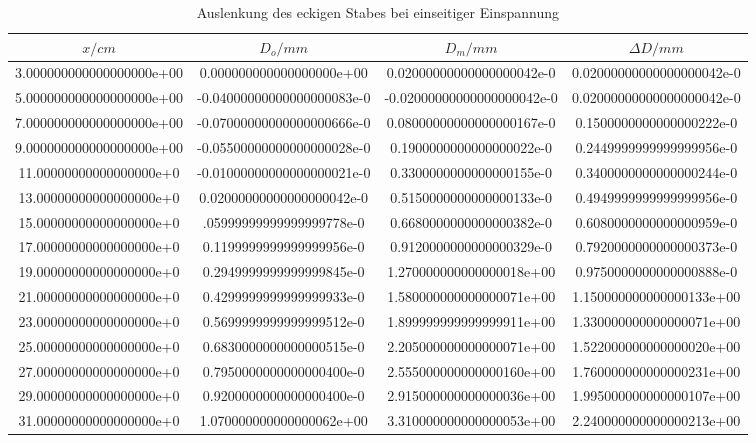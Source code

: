 \begin{table}
  \centering
  \caption{Auslenkung des eckigen Stabes bei einseitiger Einspannung}
  \label{tab:einseitig-q}
  \begin{tabular}{S S S S}
    \toprule
    {$x/cm$} & {$D_o/mm$} & {$D_m /mm$} & {$\Delta D /mm$}\\
    \midrule
    3.000000000000000000e+00 & 0.000000000000000000e+00 & 0.02000000000000000042e-0 & 0.02000000000000000042e-0\\
    5.000000000000000000e+00 & -0.04000000000000000083e-0 & -0.02000000000000000042e-0 & 0.02000000000000000042e-0\\
    7.000000000000000000e+00 & -0.07000000000000000666e-0 & 0.08000000000000000167e-0 & 0.1500000000000000222e-0\\
    9.000000000000000000e+00 & -0.05500000000000000028e-0 & 0.1900000000000000022e-0 & 0.2449999999999999956e-0\\
    11.00000000000000000e+0 & -0.01000000000000000021e-0 & 0.3300000000000000155e-0 & 0.3400000000000000244e-0\\
    13.00000000000000000e+0 & 0.02000000000000000042e-0 & 0.5150000000000000133e-0 & 0.4949999999999999956e-0\\
    15.00000000000000000e+0 & .05999999999999999778e-0 & 0.6680000000000000382e-0 & 0.6080000000000000959e-0\\
    17.00000000000000000e+0 & 0.1199999999999999956e-0 & 0.9120000000000000329e-0 & 0.7920000000000000373e-0\\
    19.00000000000000000e+0 & 0.2949999999999999845e-0 & 1.270000000000000018e+00 & 0.9750000000000000888e-0\\
    21.00000000000000000e+0 & 0.4299999999999999933e-0 & 1.580000000000000071e+00 & 1.150000000000000133e+00\\
    23.00000000000000000e+0 & 0.5699999999999999512e-0 & 1.899999999999999911e+00 & 1.330000000000000071e+00\\
    25.00000000000000000e+0 & 0.6830000000000000515e-0 & 2.205000000000000071e+00 & 1.522000000000000020e+00\\
    27.00000000000000000e+0 & 0.7950000000000000400e-0 & 2.555000000000000160e+00 & 1.760000000000000231e+00\\
    29.00000000000000000e+0 & 0.9200000000000000400e-0 & 2.915000000000000036e+00 & 1.995000000000000107e+00\\
    31.00000000000000000e+0 & 1.070000000000000062e+00 & 3.310000000000000053e+00 & 2.240000000000000213e+00\\

\end{tabular}
\end{table}
